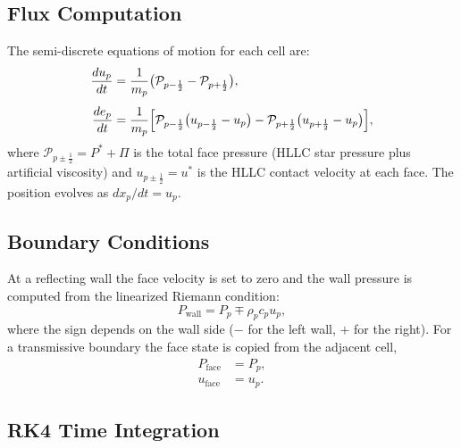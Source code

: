 \documentclass[twocolumn]{aastex63}
\newcommand{\vel}{{u}}
\begin{document}
\subsection{Flux Computation}

The semi-discrete equations of motion for each cell are:
\begin{align}
  \frac{d\vel_p}{dt} &= \frac{1}{m_p}
    \bigl(\mathcal{P}_{p-\frac{1}{2}} - \mathcal{P}_{p+\frac{1}{2}}\bigr),
    \label{eq:dvdt}\\[4pt]
  \frac{de_p}{dt} &= \frac{1}{m_p}
    \Bigl[\mathcal{P}_{p-\frac{1}{2}}
      \bigl(\vel_{p-\frac{1}{2}} - \vel_p\bigr)
    - \mathcal{P}_{p+\frac{1}{2}}
      \bigl(\vel_{p+\frac{1}{2}} - \vel_p\bigr)\Bigr],
    \label{eq:dedt}
\end{align}
where $\mathcal{P}_{p\pm\frac{1}{2}} = P^* + \Pi$ is the total face
pressure (HLLC star pressure plus artificial viscosity) and
$\vel_{p\pm\frac{1}{2}} = \vel^*$ is the HLLC contact velocity at
each face.
The position evolves as $dx_p/dt = \vel_p$.


\subsection{Boundary Conditions}

At a reflecting wall the face velocity is set to zero and
the wall pressure is computed from the
linearized Riemann condition:
\begin{equation}
  P_\mathrm{wall} = P_p \mp \rho_p c_p \vel_p,
\end{equation}
where the sign depends on the wall side
($-$ for the left wall, $+$ for the right).
For a transmissive boundary the face state is copied from the adjacent cell,
\begin{equation*}
\begin{aligned}
  P_\mathrm{face} &= P_p,\\
  \vel_\mathrm{face} &= \vel_p.
\end{aligned}
\end{equation*}


\subsection{RK4 Time Integration}
\end{document}
